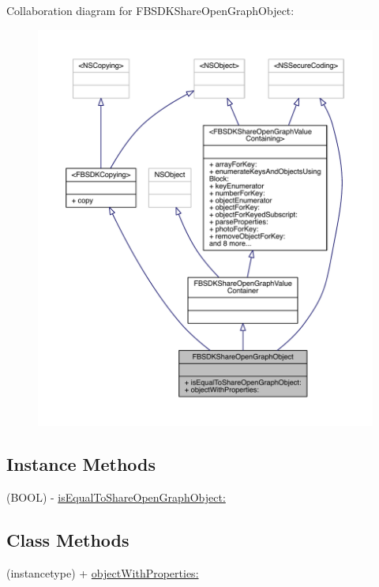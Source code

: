 Collaboration diagram for F\-B\-S\-D\-K\-Share\-Open\-Graph\-Object\-:
\nopagebreak
\begin{figure}[H]
\begin{center}
\leavevmode
\includegraphics[width=350pt]{interface_f_b_s_d_k_share_open_graph_object__coll__graph}
\end{center}
\end{figure}
\subsection*{Instance Methods}
\begin{DoxyCompactItemize}
\item 
(B\-O\-O\-L) -\/ \hyperlink{interface_f_b_s_d_k_share_open_graph_object_a37c41cf21bbb6f1644d988b8ebe8c123}{is\-Equal\-To\-Share\-Open\-Graph\-Object\-:}
\end{DoxyCompactItemize}
\subsection*{Class Methods}
\begin{DoxyCompactItemize}
\item 
(instancetype) + \hyperlink{interface_f_b_s_d_k_share_open_graph_object_a89a8b7be998e2e65e4e2a31ce278c8c1}{object\-With\-Properties\-:}
\end{DoxyCompactItemize}



